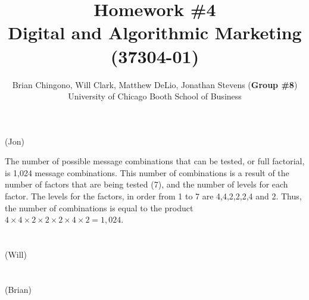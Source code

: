 



\title{Homework \#4\\
Digital and Algorithmic Marketing (37304-01)}
\author{
Brian Chingono, Will Clark, Matthew DeLio, Jonathan Stevens (\textbf{Group \#8})\\
University of Chicago Booth School of Business}

\maketitle

\section{} (Jon) %

The number of possible message combinations that can be tested, or full factorial, is 1,024 message combinations. This number of combinations is a result of the number of factors that are being tested (7), and the number of levels for each factor.  The levels for the factors, in order from 1 to 7 are 4,4,2,2,2,4 and 2.  Thus, the number of combinations is equal to the product $4\times4\times2\times2\times2\times4\times2 = 1,024$.    

\section{} (Will) %



\section{} (Brian) %



% 


